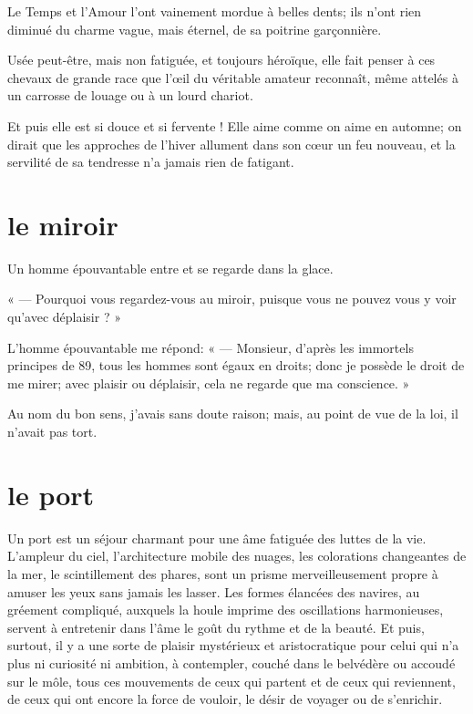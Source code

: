 Le Temps et l’Amour l’ont vainement
mordue à belles dents; ils n’ont rien diminué du
charme vague, mais éternel, de sa poitrine garçonnière.

Usée peut{}-être, mais non fatiguée, et toujours héroïque, elle fait
penser à ces chevaux de grande race que l’\oe il du
véritable amateur reconnaît, même attelés à un carrosse de louage ou à
un lourd chariot.

Et puis elle est si douce et si fervente ! Elle aime comme on aime en
automne; on dirait que les approches de l’hiver
allument dans son c\oe ur un feu nouveau, et la servilité de sa tendresse
n’a jamais rien de fatigant.

\quebra\section[Le miroir]{le miroir}

Un homme épouvantable entre et se regarde dans la glace.

« --- Pourquoi vous regardez{}-vous au miroir, puisque vous ne pouvez vous
y voir qu’avec déplaisir ? »

L’homme épouvantable me répond: « --- Monsieur,
d’après les immortels principes de 89, tous les hommes
sont égaux en droits; donc je possède le droit de me mirer; avec
plaisir ou déplaisir, cela ne regarde que ma conscience. »

Au nom du bon sens, j’avais sans doute raison; mais, au
point de vue de la loi, il n’avait pas tort.

\quebra\section[Le port]{le port }

Un port est un séjour charmant pour une âme fatiguée des luttes de la
vie. L’ampleur du ciel,
l’architecture mobile des nuages, les colorations
changeantes de la mer, le scintillement des phares, sont un prisme
merveilleusement propre à amuser les yeux sans jamais les lasser. Les
formes élancées des navires, au gréement compliqué, auxquels la houle
imprime des oscillations harmonieuses, servent à entretenir dans
l’âme le goût du rythme et de la beauté. Et puis,
surtout, il y a une sorte de plaisir mystérieux et aristocratique pour
celui qui n’a plus ni curiosité ni ambition, à
contempler, couché dans le belvédère ou accoudé sur le môle, tous ces
mouvements de ceux qui partent et de ceux qui reviennent, de ceux qui
ont encore la force de vouloir, le désir de voyager ou de
s’enrichir.

